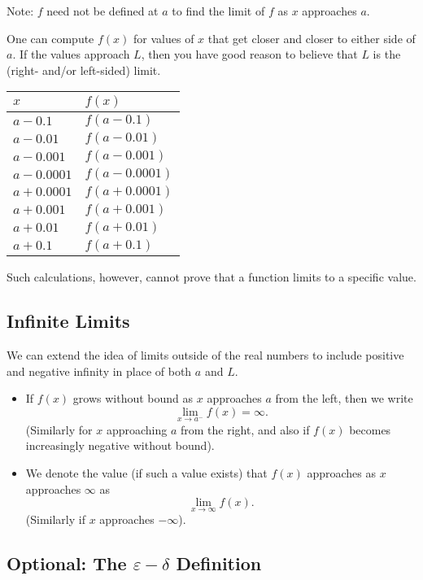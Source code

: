 \noindent Note: $f$ need not be defined at $a$ to find the limit of $f$ as $x$ approaches $a$.

\vspace{1em}

One can compute $f(x)$ for values of $x$ that get closer and closer to either side of $a$. If the values approach $L$, then you have good reason to believe that $L$ is the (right- and/or left-sided) limit.

\begin{center}
\begin{tabular}{@{}ll@{}}
\toprule[0.4mm]
   $x$        & $f(x)$        \\
\midrule
   $a-0.1$    & $f(a-0.1)$    \\
   $a-0.01$   & $f(a-0.01)$   \\
   $a-0.001$  & $f(a-0.001)$  \\
   $a-0.0001$ & $f(a-0.0001)$ \\
\midrule
   $a+0.0001$ & $f(a+0.0001)$ \\
   $a+0.001$  & $f(a+0.001)$  \\
   $a+0.01$   & $f(a+0.01)$   \\
   $a+0.1$    & $f(a+0.1)$    \\
\bottomrule[0.4mm]
\end{tabular}
\end{center}
Such calculations, however, cannot prove that a function limits to a specific value.

\subsection{Infinite Limits}

We can extend the idea of limits outside of the real numbers to include positive and negative infinity in place of both $a$ and $L$.
\begin{itemize}
\item If $f(x)$ grows without bound as $x$ approaches $a$ from the left, then we write $$\lim_{x\to a^-}f(x)=\infty.$$
(Similarly for $x$ approaching $a$ from the right, and also if $f(x)$ becomes increasingly negative without bound).
\item We denote the value (if such a value exists) that $f(x)$ approaches as $x$ approaches $\infty$ as $$\lim_{x\to\infty} f(x).$$
(Similarly if $x$ approaches $-\infty$).
\end{itemize}



\subsection{Optional: The $\varepsilon-\delta$ Definition}

